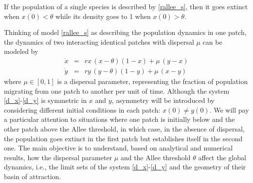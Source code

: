 \begin{lemma}
\label{l_sae}
 If the population of a single species is described by \eqref{rallee_s}, then it goes extinct when $x (0) < \theta$ while its
 density goes to 1 when $x (0) > \theta$.
\end{lemma}
 Thinking of model \eqref{rallee_s} as describing the population dynamics in one patch, the dynamics of two interacting
 identical patches with dispersal $\mu$ can be modeled by
\begin{eqnarray}
\label{d_x}
 \dot{x} & = & r x \,(x - \theta) (1 - x) + \mu \,(y - x) \\
\label{d_y}
 \dot{y} & = & r y \,(y - \theta) (1 - y) + \mu \,(x - y)
\end{eqnarray}
 where $\mu \in [0, 1]$ is a dispersal parameter, representing the fraction of population migrating from one patch to another
 per unit of time.
 Although the system \eqref{d_x}-\eqref{d_y} is symmetric in $x$ and $y$, asymmetry will be introduced by considering different
 initial conditions in each patch: $x (0) \neq y (0)$.
 We will pay a particular attention to situations where one patch is initially below and the other patch above the Allee threshold,
 in which case, in the absence of dispersal, the population goes extinct in the first patch but establishes itself in the second one.
 The main objective is to understand, based on analytical and numerical results, how the dispersal parameter $\mu$ and the Allee
 threshold $\theta$ affect the global dynamics, i.e., the limit sets of the system \eqref{d_x}-\eqref{d_y} and the geometry of
 their basin of attraction.

